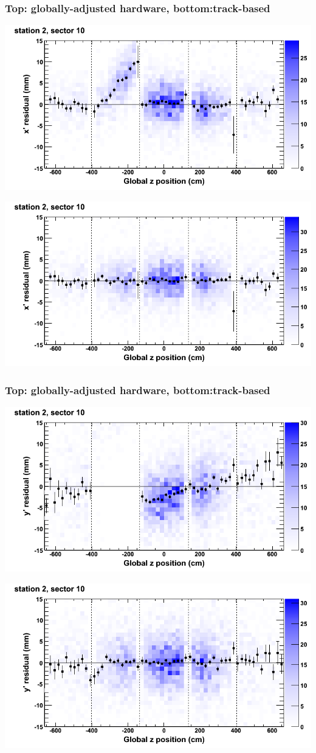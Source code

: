 \documentclass[compress]{beamer}
\begin{document}
\begin{frame}
\frametitle{Top: globally-adjusted hardware, bottom:track-based}
\includegraphics[width=0.7\linewidth]{NOV4_mapplots_HW/DTvsz_st2sec10_x.png}

\includegraphics[width=0.7\linewidth]{NOV4_mapplots/DTvsz_st2sec10_x.png}
\end{frame}

\begin{frame}
\frametitle{Top: globally-adjusted hardware, bottom:track-based}
\includegraphics[width=0.7\linewidth]{NOV4_mapplots_HW/DTvsz_st2sec10_y.png}

\includegraphics[width=0.7\linewidth]{NOV4_mapplots/DTvsz_st2sec10_y.png}
\end{frame}
\end{document}
